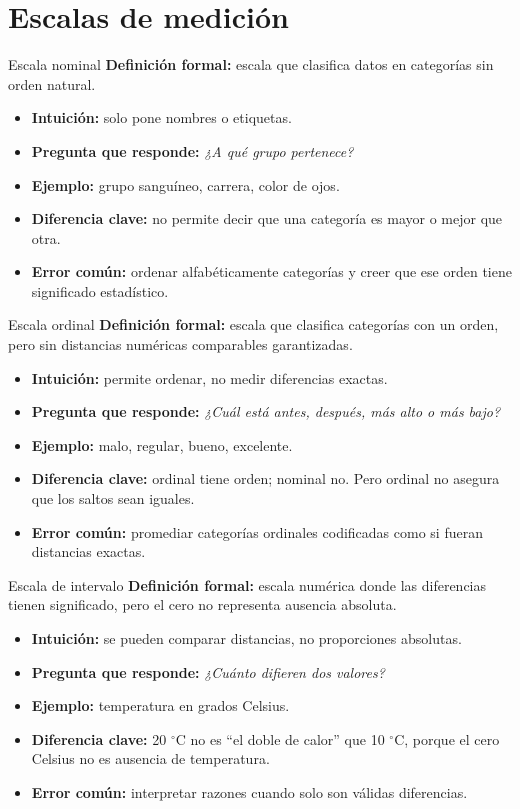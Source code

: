 \documentclass[aspectratio=169,11pt]{beamer}
\newcommand{\pregunta}[1]{\textbf{Pregunta que responde:} \emph{#1}}
\newcommand{\errorcomun}[1]{\textbf{Error común:} #1}
\newcommand{\diferencia}[1]{\textbf{Diferencia clave:} #1}
\begin{document}
\section{Escalas de medición}

\begin{frame}{Escala nominal}
\textbf{Definición formal:} escala que clasifica datos en categorías sin orden natural.
\begin{itemize}
  \item \textbf{Intuición:} solo pone nombres o etiquetas.
  \item \pregunta{¿A qué grupo pertenece?}
  \item \textbf{Ejemplo:} grupo sanguíneo, carrera, color de ojos.
  \item \diferencia{no permite decir que una categoría es mayor o mejor que otra.}
  \item \errorcomun{ordenar alfabéticamente categorías y creer que ese orden tiene significado estadístico.}
\end{itemize}
\end{frame}

\begin{frame}{Escala ordinal}
\textbf{Definición formal:} escala que clasifica categorías con un orden, pero sin distancias numéricas comparables garantizadas.
\begin{itemize}
  \item \textbf{Intuición:} permite ordenar, no medir diferencias exactas.
  \item \pregunta{¿Cuál está antes, después, más alto o más bajo?}
  \item \textbf{Ejemplo:} malo, regular, bueno, excelente.
  \item \diferencia{ordinal tiene orden; nominal no. Pero ordinal no asegura que los saltos sean iguales.}
  \item \errorcomun{promediar categorías ordinales codificadas como si fueran distancias exactas.}
\end{itemize}
\end{frame}

\begin{frame}{Escala de intervalo}
\textbf{Definición formal:} escala numérica donde las diferencias tienen significado, pero el cero no representa ausencia absoluta.
\begin{itemize}
  \item \textbf{Intuición:} se pueden comparar distancias, no proporciones absolutas.
  \item \pregunta{¿Cuánto difieren dos valores?}
  \item \textbf{Ejemplo:} temperatura en grados Celsius.
  \item \diferencia{20 $^\circ$C no es ``el doble de calor'' que 10 $^\circ$C, porque el cero Celsius no es ausencia de temperatura.}
  \item \errorcomun{interpretar razones cuando solo son válidas diferencias.}
\end{itemize}
\end{frame}
\end{document}
